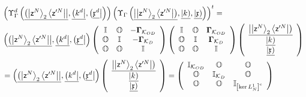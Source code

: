 \documentclass[aps,preprint]{revtex4}%
\begin{document}
\begin{align}
&  \left(  \Upsilon_{\Gamma}^{d}\left(  \underline{\left(  \left\vert
\mathsf{z}^{N}\right\rangle _{2}\left\langle \mathsf{z}^{\prime N}\right\vert
\right\vert },\underline{\left(  k^{d}\right\vert },\left(  \underline
{\mathfrak{x}^{d}}\right\vert \right)  \right)  \left(  \Upsilon_{\Gamma
}\left(  \underline{\left\vert \left\vert \mathsf{z}^{N}\right\rangle
_{2}\left\langle \mathsf{z}^{\prime N}\right\vert \right)  },\underline
{\left\vert k\right)  },\underline{\left\vert \mathfrak{x}\right)  }\right)
\right)  ^{t}=\nonumber\\
&  \left(  \underline{\left(  \left\vert \mathsf{z}^{N}\right\rangle
_{2}\left\langle \mathsf{z}^{\prime N}\right\vert \right\vert },\underline
{\left(  k^{d}\right\vert },\left(  \underline{\mathfrak{x}^{d}}\right\vert
\right)  \left(
\begin{array}
[c]{ccc}%
\mathbb{I} & \mathbb{O} & -\mathbf{\Gamma}_{\mathcal{K}_{OD}}\\
\mathbb{O} & \mathbb{I} & -\mathbf{\Gamma}_{\mathcal{K}_{D}}\\
\mathbb{O} & \mathbb{O} & \mathbb{I}%
\end{array}
\right)  \left(
\begin{array}
[c]{ccc}%
\mathbb{I} & \mathbb{O} & \mathbf{\Gamma}_{\mathcal{K}_{OD}}\\
\mathbb{O} & \mathbb{I} & \mathbf{\Gamma}_{\mathcal{K}_{D}}\\
\mathbb{O} & \mathbb{O} & \mathbb{I}%
\end{array}
\right)  \left(
\begin{array}
[c]{c}%
\underline{\left\vert \left\vert \mathsf{z}^{N}\right\rangle _{2}\left\langle
\mathsf{z}^{\prime N}\right\vert \right)  }\\
\underline{\left\vert k\right)  }\\
\underline{\left\vert \mathfrak{x}\right)  }%
\end{array}
\right) \nonumber\\
&  \left.  =\right.  \left(  \underline{\left(  \left\vert \mathsf{z}%
^{N}\right\rangle _{2}\left\langle \mathsf{z}^{\prime N}\right\vert
\right\vert },\underline{\left(  k^{d}\right\vert },\left(  \underline
{\mathfrak{x}^{d}}\right\vert \right)  \left(
\begin{array}
[c]{c}%
\underline{\left\vert \left\vert \mathsf{z}^{N}\right\rangle _{2}\left\langle
\mathsf{z}^{\prime N}\right\vert \right)  }\\
\underline{\left\vert k\right)  }\\
\underline{\left\vert \mathfrak{x}\right)  }%
\end{array}
\right)  =\left(
\begin{array}
[c]{ccc}%
\mathbb{I}_{\mathcal{K}_{OD}} & \mathbb{O} & \mathbb{O}\\
\mathbb{O} & \mathbb{I}_{\mathcal{K}_{D}} & \mathbb{O}\\
\mathbb{O} & \mathbb{O} & \mathbb{I}_{\left[  \ker L_{N}^{1}\right]  ^{c}}%
\end{array}
\right)
\end{align}
\end{document}
